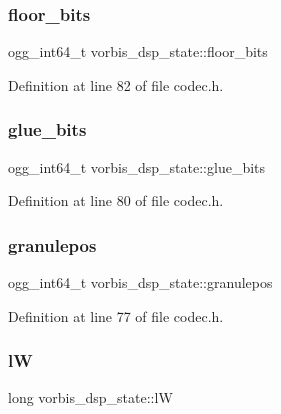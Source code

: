 \subsubsection{\texorpdfstring{floor\_bits}{floor\_bits}}
{\footnotesize\ttfamily ogg\+\_\+int64\+\_\+t vorbis\+\_\+dsp\+\_\+state\+::floor\+\_\+bits}



Definition at line 82 of file codec.\+h.

\mbox{\label{structvorbis__dsp__state_ae2d065c13e84870fd889c82cd2e7a04f}} 
\subsubsection{\texorpdfstring{glue\_bits}{glue\_bits}}
{\footnotesize\ttfamily ogg\+\_\+int64\+\_\+t vorbis\+\_\+dsp\+\_\+state\+::glue\+\_\+bits}



Definition at line 80 of file codec.\+h.

\mbox{\label{structvorbis__dsp__state_af84a7a4855db2744d1ef73f48cb6b352}} 
\subsubsection{\texorpdfstring{granulepos}{granulepos}}
{\footnotesize\ttfamily ogg\+\_\+int64\+\_\+t vorbis\+\_\+dsp\+\_\+state\+::granulepos}



Definition at line 77 of file codec.\+h.

\mbox{\label{structvorbis__dsp__state_a7086b355f6ffe286f388e95df943cac0}} 
\subsubsection{\texorpdfstring{lW}{lW}}
{\footnotesize\ttfamily long vorbis\+\_\+dsp\+\_\+state\+::lW}




